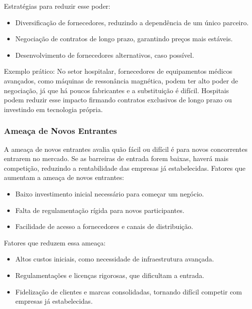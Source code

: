 \documentclass[11pt]{article}
\begin{document}
Estratégias para reduzir esse poder:

\begin{itemize}
\item Diversificação de fornecedores, reduzindo a dependência de um único parceiro.
\item Negociação de contratos de longo prazo, garantindo preços mais estáveis.
\item Desenvolvimento de fornecedores alternativos, caso possível.
\end{itemize}

\begingroup
\leftskip=4cm
\parindent=0pt
Exemplo prático: No setor hospitalar, fornecedores de equipamentos médicos avançados, como máquinas de ressonância magnética, podem ter alto poder de negociação, já que há poucos fabricantes e a substituição é difícil. Hospitais podem reduzir esse impacto firmando contratos exclusivos de longo prazo ou investindo em tecnologia própria.
\par
\endgroup
\subsubsection{Ameaça de Novos Entrantes}
\label{sec:orgb2305b8}

A ameaça de novos entrantes avalia quão fácil ou difícil é para novos concorrentes entrarem no mercado. Se as barreiras de entrada forem baixas, haverá mais competição, reduzindo a rentabilidade das empresas já estabelecidas.
Fatores que aumentam a ameaça de novos entrantes:

\begin{itemize}
\item Baixo investimento inicial necessário para começar um negócio.
\item Falta de regulamentação rígida para novos participantes.
\item Facilidade de acesso a fornecedores e canais de distribuição.
\end{itemize}

Fatores que reduzem essa ameaça:

\begin{itemize}
\item Altos custos iniciais, como necessidade de infraestrutura avançada.
\item Regulamentações e licenças rigorosas, que dificultam a entrada.
\item Fidelização de clientes e marcas consolidadas, tornando difícil competir com empresas já estabelecidas.
\end{itemize}
\end{document}
